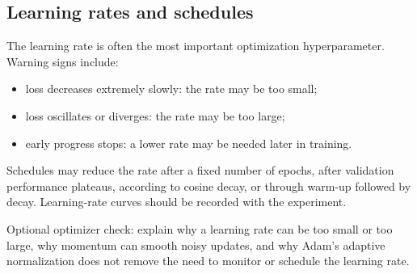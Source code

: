 \subsection{Learning rates and schedules}

The learning rate is often the most important optimization hyperparameter. Warning signs include:

\begin{itemize}
  \item loss decreases extremely slowly: the rate may be too small;
  \item loss oscillates or diverges: the rate may be too large;
  \item early progress stops: a lower rate may be needed later in training.
\end{itemize}

Schedules may reduce the rate after a fixed number of epochs, after validation performance plateaus, according to cosine decay, or through warm-up followed by decay. Learning-rate curves should be recorded with the experiment.

\begin{secondpass}
Optional optimizer check: explain why a learning rate can be too small or too large, why momentum can smooth noisy updates, and why Adam's adaptive normalization does not remove the need to monitor or schedule the learning rate.
\end{secondpass}
